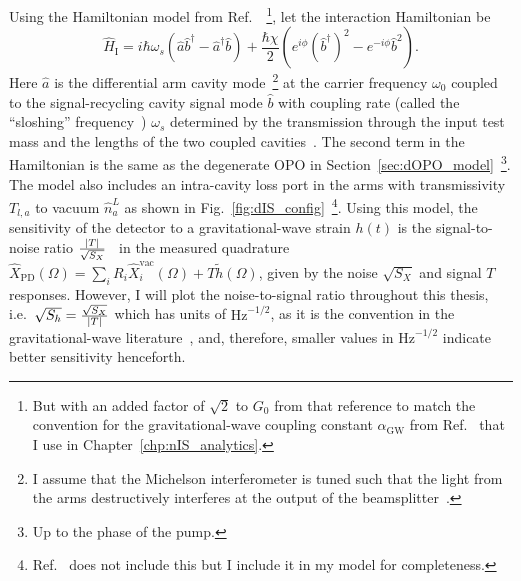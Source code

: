 Using the Hamiltonian model from Ref.~\cite{korobkoQuantumExpanderGravitationalwave2019}~\footnote{But with an added factor of $\sqrt{2}$ to $G_0$ from that reference to match the convention for the gravitational-wave coupling constant $\alpha_\text{GW}$ from Ref.~\cite{liBroadbandSensitivityImprovement2020} that I use in Chapter~\ref{chp:nIS_analytics}.}, let the interaction Hamiltonian be
\begin{equation}
\hat{H}_\text{I}=i\hbar\omega_s(\hat{a}\hat{b}^\dag-\hat{a}^\dag\hat{b})+\frac{\hbar\chi}{2}(e^{i\phi} (\hat b^\dag)^2 - e^{-i\phi} \hat b^2).
\end{equation}
Here $\hat a$ is the differential arm cavity mode~\footnote{I assume that the Michelson interferometer is tuned such that the light from the arms destructively interferes at the output of the beamsplitter~\cite{}.} at the carrier frequency $\omega_0$ coupled to the signal-recycling cavity signal mode $\hat b$ with coupling rate (called the ``sloshing'' frequency~\cite{}) $\omega_s$ determined by the transmission through the input test mass and the lengths of the two coupled cavities~\cite{}. %
The second term in the Hamiltonian is the same as the degenerate OPO in Section~\ref{sec:dOPO_model}~\footnote{Up to the phase of the pump.}.
The model also includes an intra-cavity loss port in the arms with transmissivity $T_{l,a}$ to vacuum $\hat n^L_a$ as shown in Fig.~\ref{fig:dIS_config}~\footnote{Ref.~\cite{korobkoQuantumExpanderGravitationalwave2019} does not include this but I include it in my model for completeness.}. 
Using this model, the sensitivity of the detector to a gravitational-wave strain $h(t)$ is the signal-to-noise ratio $\frac{\abs{T}}{\sqrt{S_X}}$~\cite{} in the measured quadrature $\hat X_\text{PD}(\Omega)=\sum_i R_i \hat X_i^\text{vac}(\Omega) + T \tilde h(\Omega)$, given by the noise $\sqrt{S_X}$ and signal $T$ responses. However, I will plot the noise-to-signal ratio throughout this thesis, i.e.\ $\sqrt{S_h}=\frac{\sqrt{S_X}}{\abs{T}}$ which has units of $\text{Hz}^{-1/2}$, as it is the convention in the gravitational-wave literature~\cite{}, and, therefore, smaller values in $\text{Hz}^{-1/2}$ indicate better sensitivity henceforth. 

